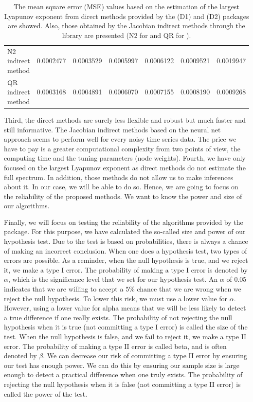 \begin{table}[ht!]
\begin{adjustbox}{width=\textwidth}
\begin{tabular}{l|cccccc}
N2 indirect method      & 0.0002477 & 0.0003529 & 0.0005997 & 0.0006122 & 0.0009521 & 0.0019947 \\ 
QR indirect method      & 0.0003168 & 0.0004891 & 0.0006070 & 0.0007155 & 0.0008190 & 0.0009268 \\  \hline
\end{tabular}
\end{adjustbox}
\caption{\label{tab:4} The mean square error (MSE) values based on the estimation of the largest Lyapunov exponent from direct methods provided by the  (D1) and  (D2) packages are showed. Also, those obtained by the Jacobian indirect methods through the  library are presented (N2 for  and QR for ).}
\end{table}

\newpage
\noindent Third, the direct methods are surely less flexible and robust but much faster and still informative. The Jacobian indirect methods based on the neural net approach seems to perform well for every noisy time series data. The price we have to pay is a greater computational complexity from two points of view, the computing time and the tuning parameters (node weights). Fourth, we have only focused on the largest Lyapunov exponent as direct methods do not estimate the full spectrum. In addition, those methods do not allow us to make inferences about it. In our case, we will be able to do so. Hence, we are going to focus on the reliability of the proposed methods. We want to know the power and size of our algorithms.

Finally, we will focus on testing the reliability of the algorithms provided by the  package. For this purpose, we have calculated the so-called size and power of our hypothesis test. Due to the test is based on probabilities, there is always a chance of making an incorrect conclusion. When one does a hypothesis test, two types of errors are possible. As a reminder, when the null hypothesis is true, and we reject it, we make a type I error. The probability of making a type I error is denoted by $\alpha$, which is the significance level that we set for our hypothesis test. An $\alpha$ of $0.05$ indicates that we are willing to accept a $5\%$ chance that we are wrong when we reject the null hypothesis. To lower this risk, we must use a lower value for $\alpha$. However, using a lower value for alpha means that we will be less likely to detect a true difference if one really exists. The probability of not rejecting the null hypothesis when it is true (not committing a type I error) is called the size of the test. When the null hypothesis is false, and we fail to reject it, we make a type II error. The probability of making a type II error is called beta, and is often denoted by $\beta$. We can decrease our risk of committing a type II error by ensuring our test has enough power. We can do this by ensuring our sample size is large enough to detect a practical difference when one truly exists. The probability of rejecting the null hypothesis when it is false (not committing a type II error) is called the power of the test.

